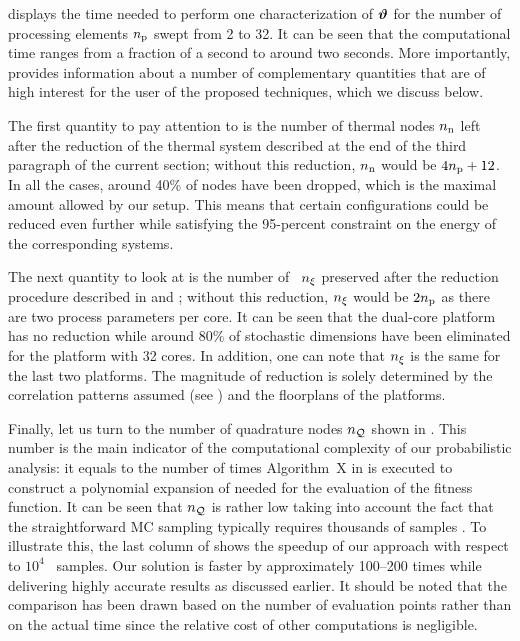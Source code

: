 
 displays the time needed to perform one characterization of $\bm{\vartheta}$ for the number of processing elements ${n_\text{p}}$ swept from 2 to 32.
It can be seen that the computational time ranges from a fraction of a second to around two seconds.
More importantly,  provides information about a number of complementary quantities that are of high interest for the user of the proposed techniques, which we discuss below.

The first quantity to pay attention to is the number of thermal nodes ${n_\text{n}}$ left after the reduction of the thermal system described at the end of the third paragraph of the current section; without this reduction, ${n_\text{n}}$ would be $4 {n_\text{p}} + 12$.
In all the cases, around 40\% of nodes have been dropped, which is the maximal amount allowed by our setup.
This means that certain configurations could be reduced even further while satisfying the 95-percent constraint on the energy of the corresponding systems.

The next quantity to look at is the number of \rvs\ ${n_\xi}$ preserved after the reduction procedure described in  and ; without this reduction, ${n_\xi}$ would be $2 {n_\text{p}}$ as there are two process parameters per core.
It can be seen that the dual-core platform has no reduction while around 80\% of stochastic dimensions have been eliminated for the platform with 32 cores.
In addition, one can note that ${n_\xi}$ is the same for the last two platforms.
The magnitude of reduction is solely determined by the correlation patterns assumed (see ) and the floorplans of the platforms.

Finally, let us turn to the number of quadrature nodes ${n_\mathcal{Q}}$ shown in .
This number is the main indicator of the computational complexity of our probabilistic analysis: it equals to the number of times Algorithm~X in  is executed to construct a polynomial expansion of  needed for the evaluation of the fitness function.
It can be seen that ${n_\mathcal{Q}}$ is rather low taking into account the fact that the straightforward MC sampling typically requires thousands of samples \cite{ukhov2014, lee2013, xiang2010, juan2012}.
To illustrate this, the last column of  shows the speedup of our approach with respect to $10^4$ \MC\ samples.
Our solution is faster by approximately 100--200 times while delivering highly accurate results as discussed earlier.
It should be noted that the comparison has been drawn based on the number of evaluation points rather than on the actual time since the relative cost of other computations is negligible.
